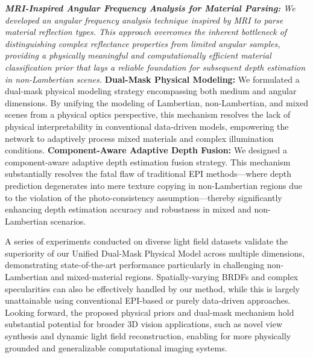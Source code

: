 \documentclass[lettersize,journal]{IEEEtran}
\begin{document}
\textit{ \textbf{MRI-Inspired Angular Frequency Analysis for Material Parsing:} We developed an angular frequency analysis technique inspired by MRI to parse material reflection types. This approach overcomes the inherent bottleneck of distinguishing complex reflectance properties from limited angular samples, providing a physically meaningful and computationally efficient material classification prior that lays a reliable foundation for subsequent depth estimation in non-Lambertian scenes.
} \textbf{Dual-Mask Physical Modeling:} We formulated a dual-mask physical modeling strategy encompassing both medium and angular dimensions. By unifying the modeling of Lambertian, non-Lambertian, and mixed scenes from a physical optics perspective, this mechanism resolves the lack of physical interpretability in conventional data-driven models, empowering the network to adaptively process mixed materials and complex illumination conditions.
\textbf{Component-Aware Adaptive Depth Fusion:} We designed a component-aware adaptive depth estimation fusion strategy. This mechanism substantially resolves the fatal flaw of traditional EPI methods—where depth prediction degenerates into mere texture copying in non-Lambertian regions due to the violation of the photo-consistency assumption—thereby significantly enhancing depth estimation accuracy and robustness in mixed and non-Lambertian scenarios.

A series of experiments conducted on diverse light field datasets validate the superiority of our Unified Dual-Mask Physical Model across multiple dimensions, demonstrating state-of-the-art performance particularly in challenging non-Lambertian and mixed-material regions. Spatially-varying BRDFs and complex specularities can also be effectively handled by our method, while this is largely unattainable using conventional EPI-based or purely data-driven approaches. Looking forward, the proposed physical priors and dual-mask mechanism hold substantial potential for broader 3D vision applications, such as novel view synthesis and dynamic light field reconstruction, enabling for more physically grounded and generalizable computational imaging systems.




\end{document}
